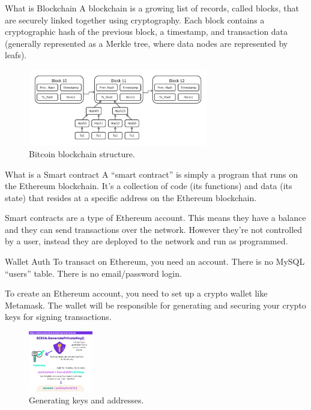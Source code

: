 \documentclass[aspectratio=169,usenames,dvipsnames,pdftex]{beamer}
\begin{document}
  \begin{frame}{What is Blockchain}
    A blockchain is a growing list of records, called blocks, that are securely linked together using cryptography. Each block contains a cryptographic hash of the previous block, a timestamp, and transaction data (generally represented as a Merkle tree, where data nodes are represented by leafs).

    \begin{figure}
      \includegraphics[width=0.7\textwidth]{bitcoin_blockchain_structure.png}
      \caption{Bitcoin blockchain structure.}
    \end{figure}
  \end{frame}

  \begin{frame}{What is a Smart contract}
    A ``smart contract'' is simply a program that runs on the Ethereum blockchain. It's a collection of code (its functions) and data (its state) that resides at a specific address on the Ethereum blockchain.

    Smart contracts are a type of Ethereum account. This means they have a balance and they can send transactions over the network. However they're not controlled by a user, instead they are deployed to the network and run as programmed.
  \end{frame}

  \begin{frame}{Wallet Auth}
    To transact on Ethereum, you need an account. There is no MySQL ``users'' table. There is no email/password login.

    To create an Ethereum account, you need to set up a crypto wallet like Metamask. The wallet will be responsible for generating and securing your crypto keys for signing transactions.

    \begin{figure}
      \includegraphics[width=0.25\textwidth]{ecdsa_generate_key.png}
      \caption{Generating keys and addresses.}
    \end{figure}
  \end{frame}
\end{document}
